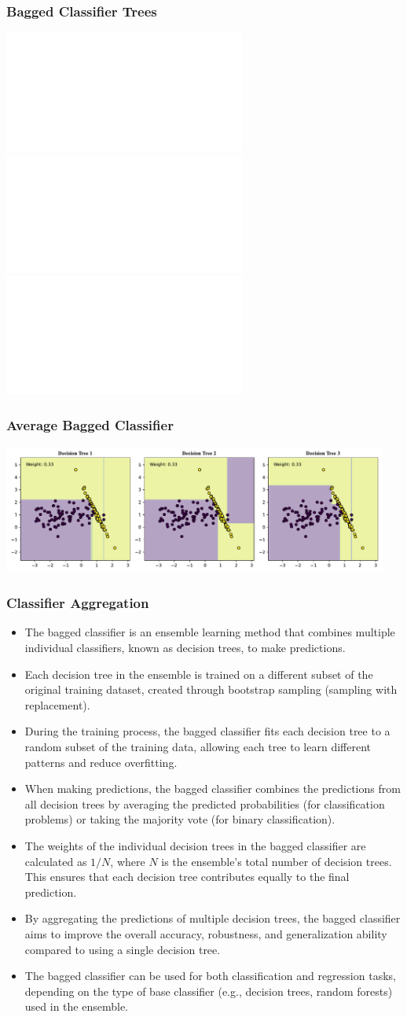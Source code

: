 \documentclass[11pt,aspectratio=1610,usenames,dvipsnames]{beamer} %
\begin{document}
\begin{frame}
	\frametitle{Bagged Classifier Trees}

	\includegraphics<1>[height=0.85\textheight]{./figures/decision_tree_1.pdf}
	\includegraphics<2>[height=0.85\textheight]{./figures/decision_tree_2.pdf}
	\includegraphics<3>[height=0.85\textheight]{./figures/decision_tree_3.pdf}

\end{frame}
\begin{frame}
	\frametitle{Average Bagged Classifier}

	\includegraphics[width=0.95\textwidth]{./figures/bagged_classifier_decision_regions.pdf}
\end{frame}


\begin{frame}[allowframebreaks]
	\frametitle{Classifier Aggregation}

	\begin{itemize}
		\item The bagged classifier is an ensemble learning method that combines multiple individual classifiers, known as decision trees, to make predictions.
		\item Each decision tree in the ensemble is trained on a different subset of the original training dataset, created through bootstrap sampling (sampling with replacement).
		\item During the training process, the bagged classifier fits each decision tree to a random subset of the training data, allowing each tree to learn different patterns and reduce overfitting.
		\item When making predictions, the bagged classifier combines the predictions from all decision trees by averaging the predicted probabilities (for classification problems) or taking the majority vote (for binary classification).
		\item The weights of the individual decision trees in the bagged classifier are calculated as $1/N$, where $N$ is the ensemble's total number of decision trees. This ensures that each decision tree contributes equally to the final prediction.
		\item By aggregating the predictions of multiple decision trees, the bagged classifier aims to improve the overall accuracy, robustness, and generalization ability compared to using a single decision tree.
		\item The bagged classifier can be used for both classification and regression tasks, depending on the type of base classifier (e.g., decision trees, random forests) used in the ensemble.
		\end{itemize}

\end{frame}
\end{document}
